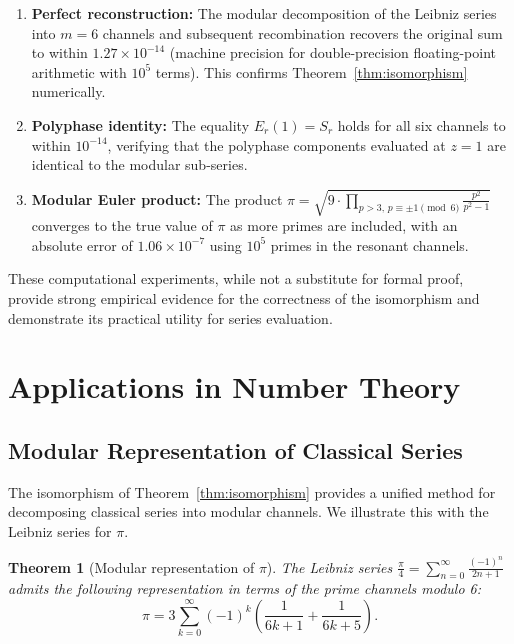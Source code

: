 \documentclass{mcom-l} %
\theoremstyle{plain} %
\newtheorem{theorem}{Theorem}[section]
\theoremstyle{definition} %
\theoremstyle{remark} %
\begin{document}
\begin{enumerate}
    \item \textbf{Perfect reconstruction:} The modular decomposition of the Leibniz series into \(m=6\) channels and subsequent recombination recovers the original sum to within \(1.27 \times 10^{-14}\) (machine precision for double-precision floating-point arithmetic with \(10^5\) terms). This confirms Theorem~\ref{thm:isomorphism} numerically.
    \item \textbf{Polyphase identity:} The equality \(E_r(1) = S_r\) holds for all six channels to within \(10^{-14}\), verifying that the polyphase components evaluated at \(z=1\) are identical to the modular sub-series.
    \item \textbf{Modular Euler product:} The product \(\pi = \sqrt{9 \cdot \prod_{p > 3, \, p \equiv \pm 1 \pmod{6}} \frac{p^2}{p^2 - 1}}\) converges to the true value of \(\pi\) as more primes are included, with an absolute error of \(1.06 \times 10^{-7}\) using \(10^5\) primes in the resonant channels.
\end{enumerate}

These computational experiments, while not a substitute for formal proof, provide strong empirical evidence for the correctness of the isomorphism and demonstrate its practical utility for series evaluation.

\section{Applications in Number Theory}
\label{sec:numbertheory}

\subsection{Modular Representation of Classical Series}
The isomorphism of Theorem~\ref{thm:isomorphism} provides a unified method for decomposing classical series into modular channels. We illustrate this with the Leibniz series for \(\pi\).

\begin{theorem}[Modular representation of \(\pi\)]
\label{thm:leibniz_mod}
The Leibniz series \(\frac{\pi}{4} = \sum_{n=0}^{\infty} \frac{(-1)^n}{2n+1}\) admits the following representation in terms of the prime channels modulo 6:
\begin{equation}
\pi = 3 \sum_{k=0}^{\infty} (-1)^k \left( \frac{1}{6k+1} + \frac{1}{6k+5} \right).
\label{eq:leibniz_mod}
\end{equation}
\end{theorem}
\end{document}
